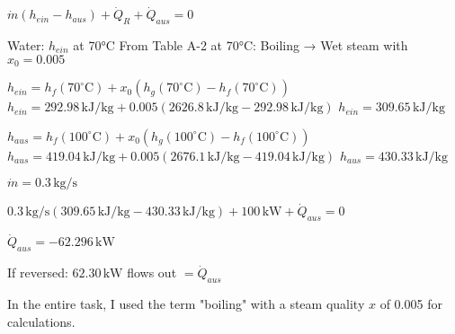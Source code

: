 \( \dot{m}(h_{ein} - h_{aus}) + \dot{Q}_R + \dot{Q}_{aus} = 0 \)  

Water:  
\( h_{ein} \) at 70°C  
From Table A-2 at 70°C:  
Boiling → Wet steam with \( x_0 = 0.005 \)  

\( h_{ein} = h_f(70^\circ \text{C}) + x_0(h_g(70^\circ \text{C}) - h_f(70^\circ \text{C})) \)  
\( h_{ein} = 292.98 \, \text{kJ/kg} + 0.005(2626.8 \, \text{kJ/kg} - 292.98 \, \text{kJ/kg}) \)  
\( h_{ein} = 309.65 \, \text{kJ/kg} \)  

\( h_{aus} = h_f(100^\circ \text{C}) + x_0(h_g(100^\circ \text{C}) - h_f(100^\circ \text{C})) \)  
\( h_{aus} = 419.04 \, \text{kJ/kg} + 0.005(2676.1 \, \text{kJ/kg} - 419.04 \, \text{kJ/kg}) \)  
\( h_{aus} = 430.33 \, \text{kJ/kg} \)  

\( \dot{m} = 0.3 \, \text{kg/s} \)  

\( 0.3 \, \text{kg/s}(309.65 \, \text{kJ/kg} - 430.33 \, \text{kJ/kg}) + 100 \, \text{kW} + \dot{Q}_{aus} = 0 \)  

\( \dot{Q}_{aus} = -62.296 \, \text{kW} \)  

If reversed:  
\( 62.30 \, \text{kW} \) flows out  
\( = \dot{Q}_{aus} \)  

In the entire task, I used the term "boiling" with a steam quality \( x \) of 0.005 for calculations.